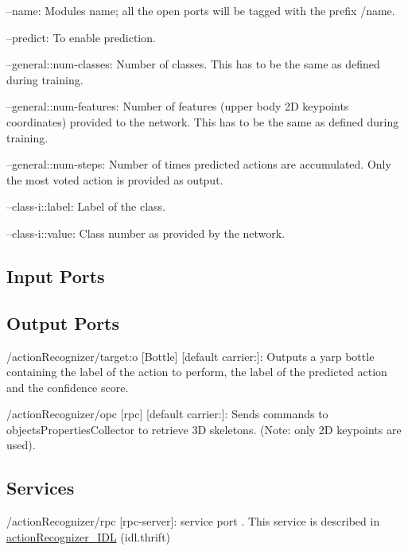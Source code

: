 \begin{DoxyItemize}
\item --name\+: Module\textquotesingle{}s name; all the open ports will be tagged with the prefix /name.
\item --predict\+: To enable prediction.
\item --general\+::num-\/classes\+: Number of classes. This has to be the same as defined during training.
\item --general\+::num-\/features\+: Number of features (upper body 2D keypoints\textquotesingle{} coordinates) provided to the network. This has to be the same as defined during training.
\item --general\+::num-\/steps\+: Number of times predicted actions are accumulated. Only the most voted action is provided as output.
\item --class-\/i\+::label\+: Label of the class.
\item --class-\/i\+::value\+: Class number as provided by the network. 
\end{DoxyItemize}\hypertarget{group__skeletonViewer_inputports_sec}{}\subsection{Input Ports}\label{group__skeletonViewer_inputports_sec}
\hypertarget{group__skeletonViewer_outputports_sec}{}\subsection{Output Ports}\label{group__skeletonViewer_outputports_sec}

\begin{DoxyItemize}
\item /action\+Recognizer/target\+:o \mbox{[}Bottle\mbox{]} \mbox{[}default carrier\+:\mbox{]}\+: Outputs a yarp bottle containing the label of the action to perform, the label of the predicted action and the confidence score.
\item /action\+Recognizer/opc \mbox{[}rpc\mbox{]} \mbox{[}default carrier\+:\mbox{]}\+: Sends commands to objects\+Properties\+Collector to retrieve 3D skeletons. (Note\+: only 2D keypoints are used).
\end{DoxyItemize}\hypertarget{group__skeletonViewer_services_sec}{}\subsection{Services}\label{group__skeletonViewer_services_sec}

\begin{DoxyItemize}
\item /action\+Recognizer/rpc \mbox{[}rpc-\/server\mbox{]}\+: service port . This service is described in \hyperlink{classactionRecognizer__IDL}{action\+Recognizer\+\_\+\+I\+DL} (idl.\+thrift) 
\end{DoxyItemize}